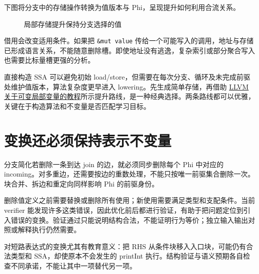 下图将分支中的存储操作转换为值版本与 Phi，呈现提升如何利用合流关系。
\begin{figure}[htbp]\centering
{}
\caption{局部存储提升保持分支选择的值}
\end{figure}

借用会改变适用条件。如果把 \texttt{\&mut value} 传给一个可能写入的调用，地址与存储已形成语言关系，不能随意删除槽。即使地址没有逃逸，复杂索引或部分聚合写入也需要比标量槽更强的分析。

直接构造 SSA 可以避免初始 load/store，但需要在每次分支、循环及未完成前驱处维护值版本，算法复杂度更早进入 lowering。先生成简单存储，再借助 \href{https://llvm.org/docs/tutorial/MyFirstLanguageFrontend/LangImpl07.html}{LLVM 关于可变局部变量的教程}所示提升路线，是一种经典选择。两条路线都可以优雅，关键在于构造算法和不变量是否匹配学习目标。

\section{变换还必须保持表示不变量}
分支简化若删除一条到达 join 的边，就必须同步删除每个 Phi 中对应的 incoming。对多重边，还需要按边的重数处理，不能只按唯一前驱集合删除一次。块合并、拆边和重定向同样影响 Phi 的前驱身份。

删除值定义之前需要替换或删除所有使用；新使用需要满足类型和支配条件。当前 verifier 能发现许多这类错误，因此优化前后都进行验证，有助于把问题定位到引入错误的变换。验证通过只能说明结构合法，不能证明行为等价；独立输入输出对照或解释执行仍然需要。

对短路表达式的变换尤其有教育意义：把 RHS 从条件块移入入口块，可能仍有合法类型和 SSA，却使原本不会发生的 printInt 执行。结构验证与语义预期各自检查不同承诺，不能让其中一项替代另一项。

